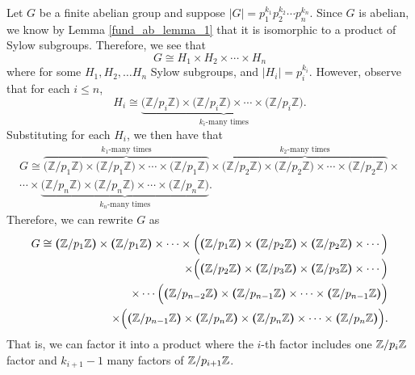     \begin{prf}
        
    Let $G$ be a finite abelian group and suppose $|G| =
    p_1^{k_1}p_2^{k_2} \cdots p_n^{k_n}$. Since $G$ is abelian, 
    we know by Lemma
    \ref{fund_ab_lemma_1} that it is isomorphic to a 
    product of Sylow subgroups. Therefore, we see that 
    \[
        G \cong H_1 \times H_2 \times \cdots \times H_n  
    \] 
    where for some $H_1, H_2, \dots H_n$ Sylow subgroups, and 
    $|H_i| = p_i^{k_i}$. However, observe that for each $i \le n$,  
    \[
        H_i \cong \underbrace{\textbf{(}\mathbb{Z}/p_i\mathbb{Z\textbf{)}} \times \textbf{(}\mathbb{Z}/p_i\mathbb{Z}\textbf{)} \times \cdots \times \textbf{(}\mathbb{Z}/p_i\mathbb{Z}\textbf{)}.}_{k_i\text{-many times}}
    \]
    Substituting for each $H_i$, we then have that 
    \begin{align*}
      G \cong \overbrace{\textbf{(}\mathbb{Z}/p_1\mathbb{Z\textbf{)}} \times \textbf{(}\mathbb{Z}/p_1\mathbb{Z}\textbf{)} \times \cdots \times \textbf{(}\mathbb{Z}/p_1\mathbb{Z}\textbf{)}}^{k_1\text{-many times}} \times 
      \overbrace{\textbf{(}\mathbb{Z}/p_2\mathbb{Z\textbf{)}} \times \textbf{(}\mathbb{Z}/p_2\mathbb{Z}\textbf{)} \times \cdots \times \textbf{(}\mathbb{Z}/p_2\mathbb{Z}\textbf{)}}^{k_2\text{-many times}}
      \times\\ 
      \cdots \times 
      \underbrace{\textbf{(}\mathbb{Z}/p_n\mathbb{Z\textbf{)}} \times \textbf{(}\mathbb{Z}/p_n\mathbb{Z}\textbf{)} \times \cdots \times \textbf{(}\mathbb{Z}/p_n\mathbb{Z}\textbf{)}}_{k_n\text{-many times}}.
    \end{align*}
    Therefore, we can rewrite $G$ as 
    \begin{align*}
       G \cong  \textbf{(}\mathbb{Z}/p_1\mathbb{Z\textbf{)}} \times \textbf{(}\mathbb{Z}/p_1\mathbb{Z}\textbf{)} \times \cdots \times \Big(\textbf{(}\mathbb{Z}/p_1\mathbb{Z}\textbf{)} \times 
      \textbf{(}\mathbb{Z}/p_2\mathbb{Z\textbf{)}} \times \textbf{(}\mathbb{Z}/p_2\mathbb{Z}\textbf{)} \times \cdots \Big)\\
     \times \Big( \textbf{(}\mathbb{Z}/p_2\mathbb{Z}\textbf{)} \times \textbf{(}\mathbb{Z}/p_3\mathbb{Z}\textbf{)}
     \times \textbf{(}\mathbb{Z}/p_3\mathbb{Z}\textbf{)}
     \times \cdots \Big) \\
      \times \cdots \Big(\textbf{(}\mathbb{Z}/p_{n-2}\mathbb{Z}\textbf{)} \times \textbf{(}\mathbb{Z}/p_{n-1}\mathbb{Z}\textbf{)} \times \cdots \times \textbf{(}\mathbb{Z}/p_{n-1}\mathbb{Z}\textbf{)} \Big)\\ 
      \times \Big(\textbf{(}\mathbb{Z}/p_{n-1}\mathbb{Z}\textbf{)} \times
      \textbf{(}\mathbb{Z}/p_n\mathbb{Z\textbf{)}} \times \textbf{(}\mathbb{Z}/p_n\mathbb{Z}\textbf{)} \times \cdots \times \textbf{(}\mathbb{Z}/p_n\mathbb{Z}\textbf{)} \Big).
    \end{align*}
    That is, we can factor it into a product where the $i$-th factor
    includes one $\mathbb{Z}/p_i\mathbb{Z}$ factor and $k_{i+1}-1$ many factors of $\mathbb{Z}/p_{i+1}\mathbb{Z}$.
    

\end{prf}
